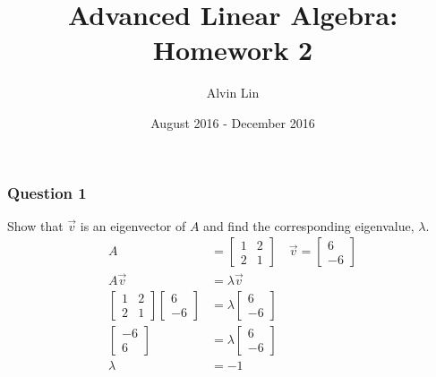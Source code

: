 \documentclass{math}
\title{Advanced Linear Algebra: Homework 2}
\author{Alvin Lin}
\date{August 2016 - December 2016}
\begin{document}
\maketitle

\subsubsection*{Question 1}
Show that \( \vec{v} \) is an eigenvector of \( A \) and find the corresponding
eigenvalue, \( \lambda \).
\begin{align*}
  A &= \begin{bmatrix}
    1 & 2 \\
    2 & 1
  \end{bmatrix} \quad \vec{v} = \begin{bmatrix}6 \\ -6\end{bmatrix} \\
  A\vec{v} &= \lambda\vec{v} \\
  \begin{bmatrix}
    1 & 2 \\
    2 & 1
  \end{bmatrix}\begin{bmatrix}6 \\ -6\end{bmatrix} &= \lambda\begin{bmatrix}
    6 \\ -6
  \end{bmatrix} \\
  \begin{bmatrix}
    -6 \\ 6
  \end{bmatrix} &= \lambda\begin{bmatrix}
    6 \\ -6
  \end{bmatrix} \\
  \lambda &= -1
\end{align*}
\end{document}
